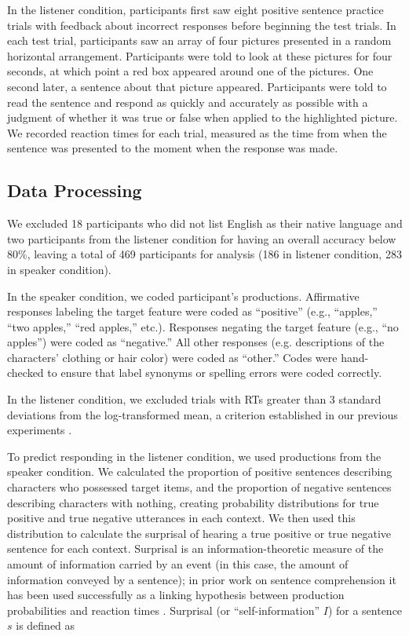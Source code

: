\documentclass[man, noapacite]{apa2}
\begin{document}
In the listener condition, participants first saw eight positive sentence practice trials with feedback about incorrect responses before beginning the test trials. In each test trial, participants saw an array of four pictures presented in a random horizontal arrangement.  Participants were told to look at these pictures for four seconds, at which point a red box appeared around one of the pictures.  One second later, a sentence about that picture appeared.  Participants were told to read the sentence and respond as quickly and accurately as possible with a judgment of whether it was true or false when applied to the highlighted picture.  We recorded reaction times for each trial, measured as the time from when the sentence was presented to the moment when the response was made.
  
\subsection{Data Processing} 
  
We excluded 18 participants who did not list English as their native language and two participants from the listener condition for having an overall accuracy below 80\%, leaving a total of 469 participants for analysis (186 in listener condition, 283 in speaker condition). 

In the speaker condition, we coded participant's productions. Affirmative responses labeling the target feature were coded as ``positive'' (e.g., ``apples,'' ``two apples,'' ``red apples,'' etc.).  Responses negating the target feature (e.g., ``no apples'') were coded as ``negative.''  All other responses (e.g. descriptions of the characters' clothing or hair color) were coded as ``other.''  Codes were hand-checked to ensure that label synonyms or spelling errors were coded correctly.

In the listener condition, we excluded trials with RTs greater than 3 standard deviations from the log-transformed mean, a criterion established in our previous experiments \cite{nordmeyer2014}.  

To predict responding in the listener condition, we used productions from the speaker condition. We calculated the proportion of positive sentences describing characters who possessed target items, and the proportion of negative sentences describing characters with nothing, creating probability distributions for true positive and true negative utterances in each context.  We then used this distribution to calculate the surprisal of hearing a true positive or true negative sentence for each context. Surprisal is an information-theoretic measure of the amount of information carried by an event (in this case, the amount of information conveyed by a sentence); in prior work on sentence comprehension it has been used successfully as a linking hypothesis between production probabilities and reaction times \cite{levy2008}. Surprisal (or ``self-information'' $I$) for a sentence $s$ is defined as
\end{document}
